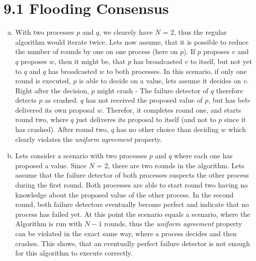 \documentclass{article}
\begin{document}
	\pagestyle{fancy}
	
    \section*{9.1 Flooding Consensus}
    \begin{enumerate}[a)]
        \item With two processes $p$ and $q$, we clearely have $N$ = 2, thus the regular algorithm would iterate twice.
        Lets now assume, that it is possible to reduce the number of rounds by one on one process (here on $p$).
        If $p$ proposes $v$ and $q$ proposes $w$, then it might be, that $p$ has broadcasted $v$ to itself, but not yet to $q$ and $q$ has broadcasted $w$ to both processes.
        In this scenario, if only one round is executed, $p$ is able to decide on a value, lets assume it decides on $v$.
        Right after the decision, $p$ might crash - The failure detector of $q$ therefore detects $p$ as crashed.
        $q$ has not received the proposed value of $p$, but has beb-delivered its own proposal $w$. Therefor, it completes round one, and starts round two, where $q$ just deliveres its proposal to itself (and not to $p$ since it has crashed).
        After round two, $q$ has no other choice than deciding $w$ which clearly violates the \textit{uniform agreement} property.
        \item Lets consider a scenario with two processes $p$ and $q$ where each one has proposed a value. Since $N$ = 2, there are two rounds in the algorithm.
        Lets assume that the failure detector of both processes suspects the other process during the first round.
        Both processes are able to start round two having no knowledge about the proposed value of the other process.
        In the second round, both failure detectors eventually become perfect and indicate that no process has failed yet.
        At this point the scenario equals a scenario, where the Algorithm is run with $N - 1$ rounds, thus the \textit{uniform agreement} property can be violated in the exact same way, where a process decides and then crashes.
        This shows, that an eventually perfect failure detector is not enough for this algorithm to execute correctly.
    \end{enumerate}
\end{document}
